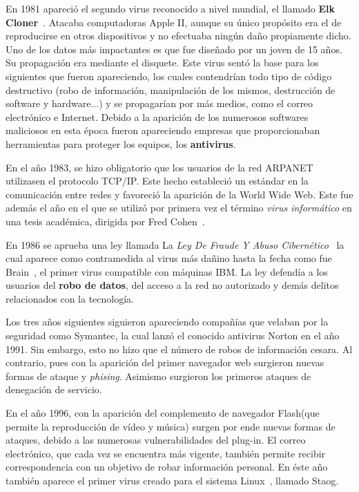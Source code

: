 En 1981 apareció el segundo virus reconocido a nivel mundial, el llamado \textbf{Elk Cloner}~\cite{article:cloner}. Atacaba computadoras Apple II, aunque su único propósito era el de reproducirse en otros dispositivos y no efectuaba ningún daño propiamente dicho. Uno de los datos más impactantes es que fue diseñado por un joven de 15 años. Su propagación era mediante el disquete. 
Este virus sentó la base para los siguientes que fueron apareciendo, los cuales contendrían todo tipo de código destructivo (robo de información, manipulación de los mismos, destrucción de software y hardware...) y se propagarían por más medios, como el correo electrónico e Internet.
Debido a la aparición de los numerosos softwares maliciosos en esta época fueron apareciendo empresas que proporcionaban herramientas para proteger los equipos, los \textbf{antivirus}.

En el año 1983, se hizo obligatorio que los usuarios de la red ARPANET utilizasen el protocolo TCP/IP. Este hecho estableció un estándar en la comunicación entre redes y favoreció la aparición de la World Wide Web.
Este fue además el año en el que se utilizó por primera vez el término \textit{virus informático} en una tesis académica, dirigida por Fred Cohen~\cite{article:cohen}.

En 1986 se aprueba una ley llamada La \textit{Ley De Fraude Y Abuso Cibernético}~\cite{article:ley} la cual aparece como contramedida al virus más dañino hasta la fecha como fue Brain~\cite{article:brain}, el primer virus compatible con máquinas IBM. La ley defendía a los usuarios del \textbf{robo de datos}, del acceso a la red no autorizado y demás delitos relacionados con la tecnología.

Los tres años siguientes siguieron apareciendo compañías que velaban por la seguridad como Symantec, la cual lanzó el conocido antivirus Norton en el año 1991.
Sin embargo, esto no hizo que el número de robos de información cesara. Al contrario, pues con la aparición del primer navegador web surgieron nuevas formas de ataque y \textit{phising}. Asimismo surgieron los primeros ataques de denegación de servicio.

En el año 1996, con la aparición del complemento de navegador Flash(que permite la reproducción de vídeo y música) surgen por ende nuevas formas de ataques, debido a las numerosas vulnerabilidades del plug-in. El correo electrónico, que cada vez se encuentra más vigente, también permite recibir correspondencia con un objetivo de robar información personal. En éste año también aparece el primer virus creado para el sistema Linux~\cite{article:staog}, llamado Staog.

